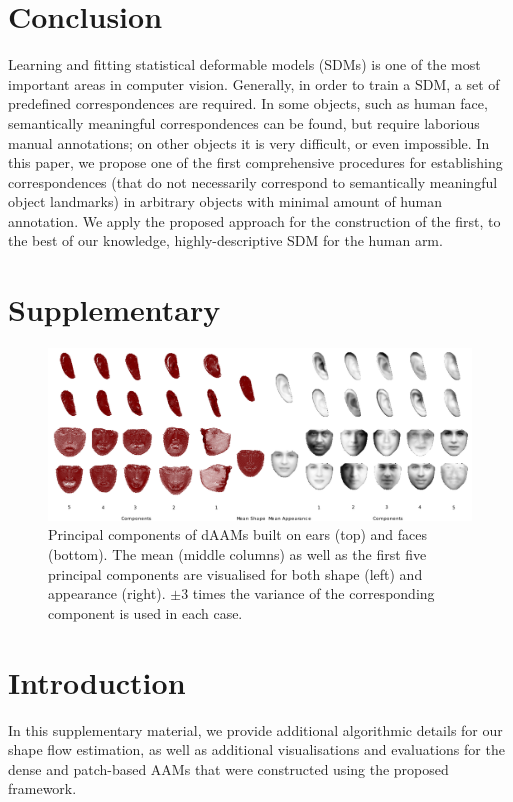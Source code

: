 \section{Conclusion}
Learning and fitting statistical deformable models (SDMs) is one of the most important areas in computer vision. Generally, in order to train a SDM, a set of predefined correspondences are required. In some objects, such as human face, semantically meaningful correspondences can be found, but require laborious manual annotations; on other objects it is very difficult, or even impossible. In this paper, we propose one of the first comprehensive procedures for establishing correspondences (that do not necessarily correspond to semantically meaningful object landmarks) in arbitrary objects with minimal amount of human annotation. We apply the proposed approach for the construction of the first, to the best of our knowledge, highly-descriptive SDM for the human arm. 

\section{Supplementary}
\begin{figure}[!b]
\centering
\includegraphics[width=\textwidth]{resources/Annotation_Correction/Suplementory_Meterial/Models/models}
\caption{Principal components of dAAMs built on ears (top) and faces (bottom). The mean (middle columns) as well as the first five principal components are visualised for both shape (left) and appearance (right). $\pm 3$ times the variance of the corresponding component is used in each case.}
\label{fig:pcamodel}
\end{figure}


\section{Introduction}
In this supplementary material, we provide additional algorithmic details for our shape flow estimation, as well as additional visualisations and evaluations for the dense and patch-based AAMs that were constructed using the proposed framework.

